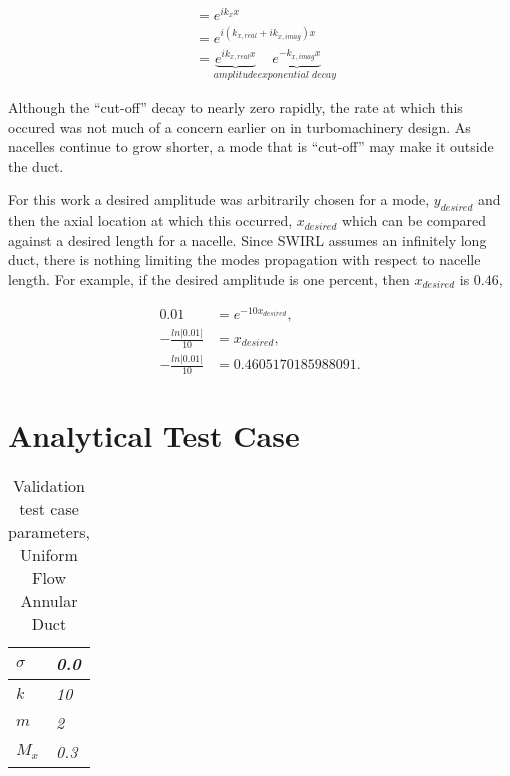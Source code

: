 \documentclass[a4paper]{report}
\begin{document}
\begin{align}
    &= e^{i k_x x} \\
    &= e^{i (k_{x,real}+ i k_{x,imag}) x} \\
    &= \underbrace{e^{i k_{x,real}x}}_{\textit{amplitude}} \underbrace{e^{- k_{x,imag} x}}_{\textit{exponential decay}} 
\end{align}

Although the ``cut-off'' decay to nearly zero rapidly, the rate at which this occured
was not much of a concern earlier on in turbomachinery design. As nacelles 
continue to grow shorter, a mode that is ``cut-off'' may make it outside the duct.

For this work a desired amplitude was arbitrarily chosen for a mode, $y_{desired}$
and then the axial location at which this occurred, $x_{desired}$ which 
can be compared against a desired length for a nacelle.  
Since SWIRL assumes an infinitely long duct, there is nothing limiting the 
modes propagation with respect to nacelle length. For example, if the 
desired amplitude is one percent, then $x_{desired}$ is $0.46$, 

\begin{align*}
    0.01 &=  e^{-10 x_{desired}},\\
    -\frac{ln|0.01|}{10} &=  x_{desired},\\
    -\frac{ln|0.01|}{10} &= 0.4605170185988091 .
\end{align*}


 
 
\section{Analytical Test Case}
\begin{table}[!h]
    \centering
    \begin{tabular}{|l|l|}
        \hline
        $\sigma$ & \textit{0.0} \\ \hline
        $k$      & \textit{10}   \\ \hline
        $m$      & \textit{2}    \\ \hline
        $M_x$    & \textit{0.3}  \\ \hline
    \end{tabular}
    \caption{Validation test case parameters, Uniform Flow Annular Duct} 
\end{table}
\end{document}
